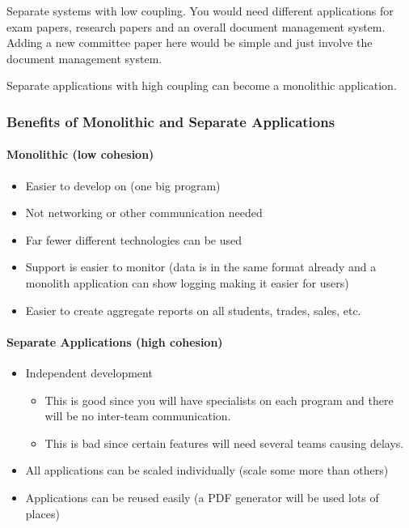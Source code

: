Separate systems with low coupling.
You would need different applications for exam papers, research papers and an overall document management system.
Adding a new committee paper here would be simple and just involve the document management system.

\begin{note}
	Separate applications with high coupling can become a monolithic application.
\end{note}

\subsubsection{Benefits of Monolithic and Separate Applications}\label{ssub:benefits_of_monolithic_and_separate_applications}

\paragraph{Monolithic (low cohesion)}\label{par:monolithic_low_cohesion_}

\begin{itemize}
	\item Easier to develop on (one big program)
	\item Not networking or other communication needed
	\item Far fewer different technologies can be used
	\item Support is easier to monitor (data is in the same format already and a monolith application can show logging making it easier for users)
	\item Easier to create aggregate reports on all students, trades, sales, etc.
\end{itemize}

\paragraph{Separate Applications (high cohesion)}\label{par:separate_applications_high_cohesion_}

\begin{itemize}
	\item Independent development
	      \begin{itemize}
		      \item This is good since you will have specialists on each program and there will be no inter-team communication.
		      \item This is bad since certain features will need several teams causing delays.
	      \end{itemize}
	\item All applications can be scaled individually (scale some more than others)
	\item Applications can be reused easily (a PDF generator will be used lots of places)
\end{itemize}

